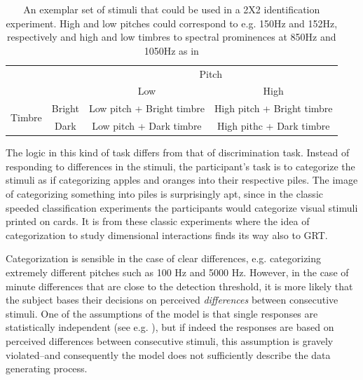 \documentclass{article}\usepackage{knitr}
\begin{document}
\begin{table}[!htb]
 \centering
  \caption{An exemplar set of stimuli that could be used in a 2X2 identification experiment. High and low pitches could correspond to e.g. 150Hz and 152Hz, respectively and high and low timbres to spectral prominences at 850Hz and 1050Hz as in \cite{silbert2009}}
  \vspace{0.5cm}
  \label{table:classicGRT}
   \begin{tabular}{rccc}
    \hline
     &       &         \multicolumn{2}{c}{Pitch} \\
                       \cline{3-4}
             &         & Low             & High   \\
     \hline
    \multirow{2}{*}{Timbre} 
            & Bright & \parbox[t]{5cm}{Low pitch + Bright timbre\\}& \parbox[t]{5cm}{High pitch + Bright timbre\\}\\
            & Dark    & \parbox[t]{5cm}{Low pitch + Dark timbre \\}  & \parbox[t]{5cm}{High pithc + Dark timbre \\ }\\
     \hline
    \end{tabular}
\end{table}

The logic in this kind of task differs from that of discrimination task. Instead of responding to differences in the stimuli, the participant's task is to categorize the stimuli as if categorizing apples and oranges into their respective piles. The image of categorizing something into piles is surprisingly apt, since in the classic speeded classification experiments \citep{garner1974} the participants would categorize visual stimuli printed on cards. It is from these classic experiments where the idea of categorization to study dimensional interactions finds its way also to GRT. 

Categorization is sensible in the case of clear differences, e.g. categorizing extremely different pitches such as 100 Hz and 5000 Hz. However, in the case of minute differences that are close to the detection threshold, it is more likely that the subject bases their decisions on perceived \textit{differences} between consecutive stimuli. One of the assumptions of the model is that single responses are statistically independent (see e.g. \citet[p. 218]{wickens1992}), but if indeed the responses are based on perceived differences between consecutive stimuli, this assumption is gravely violated--and consequently the model does not sufficiently describe the data generating process. 
\end{document}
